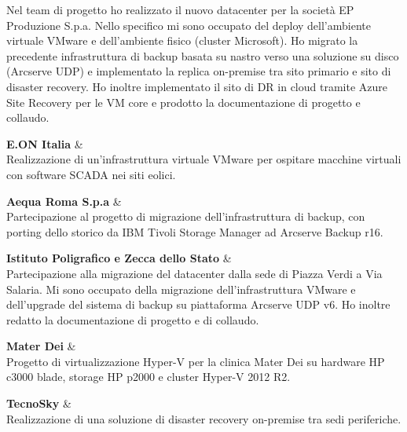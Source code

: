 \documentclass[a4paper,12pt]{article}
\begin{document}
Nel team di progetto ho realizzato il nuovo datacenter per la società EP Produzione S.p.a. Nello specifico mi sono occupato del deploy dell'ambiente virtuale VMware e dell'ambiente fisico (cluster Microsoft). 
Ho migrato la precedente infrastruttura di backup basata su nastro verso una soluzione su disco (Arcserve UDP) e implementato la replica on-premise tra sito primario e sito di disaster recovery. 
Ho inoltre implementato il sito di DR in cloud tramite Azure Site Recovery per le VM core e prodotto la documentazione di progetto e collaudo.

\vspace{6pt}

\textbf{E.ON Italia} & \\

Realizzazione di un'infrastruttura virtuale VMware per ospitare macchine virtuali con software SCADA nei siti eolici.

\vspace{6pt}

\textbf{Aequa Roma S.p.a} & \\

Partecipazione al progetto di migrazione dell'infrastruttura di backup, con porting dello storico da IBM Tivoli Storage Manager ad Arcserve Backup r16.

\vspace{6pt}

\textbf{Istituto Poligrafico e Zecca dello Stato} & \\
Partecipazione alla migrazione del datacenter dalla sede di Piazza Verdi a Via Salaria. 
Mi sono occupato della migrazione dell'infrastruttura VMware e dell'upgrade del sistema di backup su piattaforma Arcserve UDP v6. 
Ho inoltre redatto la documentazione di progetto e di collaudo.

\vspace{6pt}

\textbf{Mater Dei} & \\

Progetto di virtualizzazione Hyper-V per la clinica Mater Dei su hardware HP c3000 blade, storage HP p2000 e cluster Hyper-V 2012 R2.

\vspace{6pt}

\textbf{TecnoSky} & \\

Realizzazione di una soluzione di disaster recovery on-premise tra sedi periferiche.

\vspace{6pt}
\end{document}

